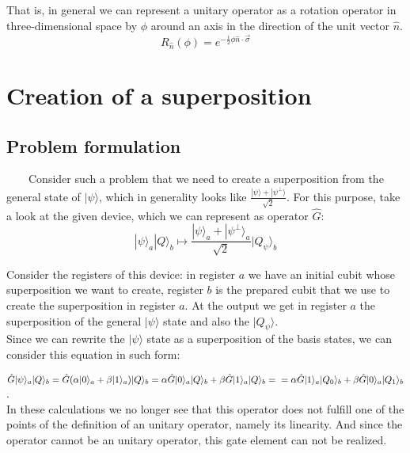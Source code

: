 \documentclass[english,14pt,a4paper]{article}
\begin{document}
\begin{spacing}{1.5}
	That is, in general we can represent a unitary operator as a rotation operator in three-dimensional space by $\phi$ around an axis in the direction of the unit vector $\hat{n}$.
	 \begin{equation}
	 R_{\hat{n}}(\phi) = e^{-\frac{i}{2}\phi \hat{n}\cdot \vec{\sigma}}
	\end{equation}
	
	
	\pagebreak
	\section{Creation of a superposition} 
	\subsection{Problem formulation} \ \ \ \
	Consider such a problem that we need to create a superposition from the general state of $|\psi\rangle$, which in generality looks like $ \frac{|\psi\rangle + |\psi^{\perp}\rangle}{\sqrt{2}}$. For this purpose, take a look at the given device, which we can represent as operator $\hat{G}$:
	\begin{equation}\label{popa_muravia}
		|\psi \rangle_a | Q \rangle _b \longmapsto \frac{|\psi \rangle_a + |\psi^{\perp} \rangle_a}{\sqrt{2}} |Q_{\psi} \rangle_b
	\end{equation} 
	
	Consider the registers of this device: in register $a$ we have an initial cubit whose superposition we want to create, register $b$ is the prepared cubit that we use to create the superposition in register $a$. At the output we get in register $a$ the superposition of the general $|\psi \rangle$ state and also the $|Q _{\psi} \rangle$. \\ 
	
	Since we can rewrite the $|\psi \rangle$ state as a superposition of the basis states, we can consider this equation in such form:
	
		$\hat{G}|\psi \rangle_a | Q \rangle _b = \hat{G}(\alpha |0 \rangle_a  + \beta |1 \rangle_a)| Q \rangle _b = \alpha \hat{G}|0 \rangle_a | Q \rangle _b + \beta \hat{G}|1 \rangle_a | Q \rangle _b = \\ = \alpha \hat{G}|1 \rangle_a | Q_0 \rangle _b + \beta \hat{G}|0 \rangle_a | Q_1 \rangle _b$. \\
		
	In these calculations we no longer see that this operator does not fulfill one of the points of the definition of an unitary operator, namely its linearity. And since the operator cannot be an unitary operator, this gate element can not be realized. \\
	

\end{spacing}
\end{document}
